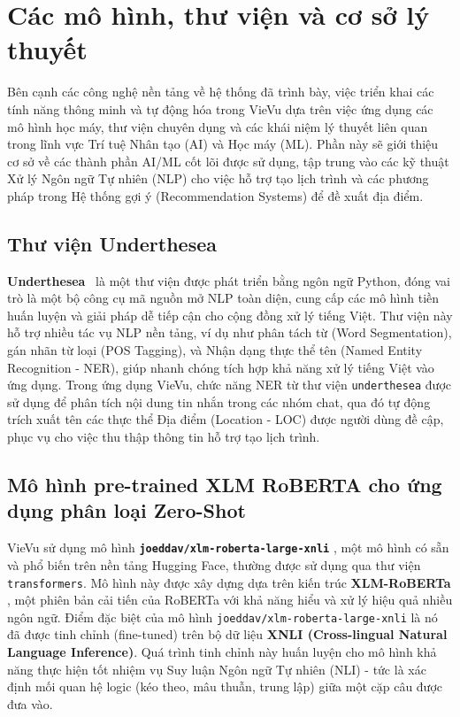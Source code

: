 \section{Các mô hình, thư viện và cơ sở lý thuyết}
Bên cạnh các công nghệ nền tảng về hệ thống đã trình bày, việc triển khai các tính năng thông minh và tự động hóa trong VieVu dựa trên việc ứng dụng các mô hình học máy, thư viện chuyên dụng và các khái niệm lý thuyết liên quan trong lĩnh vực Trí tuệ Nhân tạo (AI) và Học máy (ML). Phần này sẽ giới thiệu cơ sở về các thành phần AI/ML cốt lõi được sử dụng, tập trung vào các kỹ thuật Xử lý Ngôn ngữ Tự nhiên (NLP) cho việc hỗ trợ tạo lịch trình và các phương pháp trong Hệ thống gợi ý (Recommendation Systems) để đề xuất địa điểm.

\subsection{Thư viện Underthesea}

\textbf{Underthesea}~\cite{underthesea_lib} là một thư viện được phát triển bằng ngôn ngữ Python, đóng vai trò là một bộ công cụ mã nguồn mở NLP toàn diện, cung cấp các mô hình tiền huấn luyện và giải pháp dễ tiếp cận cho cộng đồng xử lý tiếng Việt. Thư viện này hỗ trợ nhiều tác vụ NLP nền tảng, ví dụ như phân tách từ (Word Segmentation), gán nhãn từ loại (POS Tagging), và Nhận dạng thực thể tên (Named Entity Recognition - NER), giúp nhanh chóng tích hợp khả năng xử lý tiếng Việt vào ứng dụng. Trong ứng dụng VieVu, chức năng NER từ thư viện \texttt{underthesea} được sử dụng để phân tích nội dung tin nhắn trong các nhóm chat, qua đó tự động trích xuất tên các thực thể Địa điểm (Location - LOC) được người dùng đề cập, phục vụ cho việc thu thập thông tin hỗ trợ tạo lịch trình.

\subsection{Mô hình pre-trained XLM RoBERTA cho ứng dụng phân loại Zero-Shot}

VieVu sử dụng mô hình \textbf{\texttt{joeddav/xlm-roberta-large-xnli}} \cite{xlm_roberta_xnli_model}, một mô hình có sẵn và phổ biến trên nền tảng Hugging Face, thường được sử dụng qua thư viện \texttt{transformers}. Mô hình này được xây dựng dựa trên kiến trúc \textbf{XLM-RoBERTa} \cite{xlm_roberta_paper}, một phiên bản cải tiến của RoBERTa với khả năng hiểu và xử lý hiệu quả nhiều ngôn ngữ. Điểm đặc biệt của mô hình \texttt{joeddav/xlm-roberta-large-xnli} là nó đã được tinh chỉnh (fine-tuned) trên bộ dữ liệu \textbf{XNLI (Cross-lingual Natural Language Inference)}. Quá trình tinh chỉnh này huấn luyện cho mô hình khả năng thực hiện tốt nhiệm vụ Suy luận Ngôn ngữ Tự nhiên (NLI) - tức là xác định mối quan hệ logic (kéo theo, mâu thuẫn, trung lập) giữa một cặp câu được đưa vào.
 
